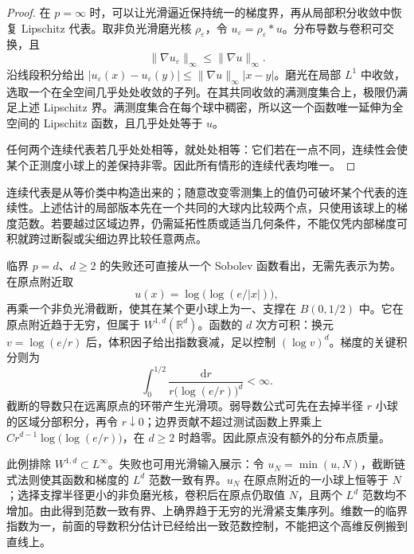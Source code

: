 \begin{proof}
在 \(p=\infty\) 时，可以让光滑逼近保持统一的梯度界，再从局部积分收敛中恢复 Lipschitz 代表。取非负光滑磨光核 \(\rho_\varepsilon\)，令 \(u_\varepsilon=\rho_\varepsilon*u\)。分布导数与卷积可交换，且
\[
 \|\nabla u_\varepsilon\|_\infty\leq\|\nabla u\|_\infty.
\]
沿线段积分给出
\(|u_\varepsilon(x)-u_\varepsilon(y)|\leq\|\nabla u\|_\infty|x-y|\)。磨光在局部 \(L^1\) 中收敛，选取一个在全空间几乎处处收敛的子列。在其共同收敛的满测度集合上，极限仍满足上述 Lipschitz 界。满测度集合在每个球中稠密，所以这一个函数唯一延伸为全空间的 Lipschitz 函数，且几乎处处等于 \(u\)。

任何两个连续代表若几乎处处相等，就处处相等：它们若在一点不同，连续性会使某个正测度小球上的差保持非零。因此所有情形的连续代表均唯一。
\end{proof}
连续代表是从等价类中构造出来的；随意改变零测集上的值仍可破坏某个代表的连续性。上述估计的局部版本先在一个共同的大球内比较两个点，只使用该球上的梯度范数。若要越过区域边界，仍需延拓性质或适当几何条件，不能仅凭内部梯度可积就跨过断裂或尖细边界比较任意两点。

\ProseParagraphBreak

临界 \(p=d\)、\(d\geq2\) 的失败还可直接从一个 Sobolev 函数看出，无需先表示为势。在原点附近取
\[
 u(x)=\log\bigl(\log(e/|x|)\bigr),
\]
再乘一个非负光滑截断，使其在某个更小球上为一、支撑在 \(B(0,1/2)\) 中。它在原点附近趋于无穷，但属于 \(W^{1,d}(\mathbb R^d)\)。函数的 \(d\) 次方可积：换元 \(v=\log(e/r)\) 后，体积因子给出指数衰减，足以控制 \((\log v)^d\)。梯度的关键积分则为
\[
 \int_0^{1/2}\frac{\mathrm dr}{r\bigl(\log(e/r)\bigr)^d}<\infty.
\]
截断的导数只在远离原点的环带产生光滑项。弱导数公式可先在去掉半径 \(r\) 小球的区域分部积分，再令 \(r\downarrow0\)；边界贡献不超过测试函数上界乘上 \(Cr^{d-1}\log\bigl(\log(e/r)\bigr)\)，在 \(d\geq2\) 时趋零。因此原点没有额外的分布点质量。

\ProseParagraphBreak

此例排除 \(W^{1,d}\subset L^\infty\)。失败也可用光滑输入展示：令 \(u_N=\min(u,N)\)，截断链式法则使其函数和梯度的 \(L^d\) 范数一致有界。\(u_N\) 在原点附近的一小球上恒等于 \(N\)；选择支撑半径更小的非负磨光核，卷积后在原点仍取值 \(N\)，且两个 \(L^d\) 范数均不增加。由此得到范数一致有界、上确界趋于无穷的光滑紧支集序列。维数一的临界指数为一，前面的导数积分估计已经给出一致范数控制，不能把这个高维反例搬到直线上。
